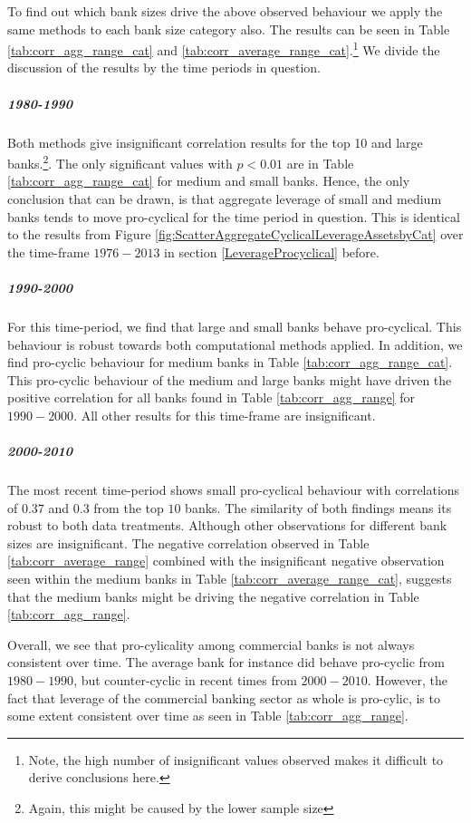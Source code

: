 \documentclass[12pt, a4paper]{article} %
\begin{document}
To find out which bank sizes drive the above observed behaviour we apply the same methods to each bank size category also. The results can be seen in Table \ref{tab:corr_agg_range_cat} and \ref{tab:corr_average_range_cat}.\footnote{Note, the high number of insignificant values observed makes it difficult to derive conclusions here.}
We divide the discussion of the results by the time periods in question.

\subparagraph{1980-1990}
Both methods give insignificant correlation results for the top 10 and large banks.\footnote{Again, this might be caused by the lower sample size}. The only significant values with $p<0.01$ are in Table \ref{tab:corr_agg_range_cat} for medium and small banks. Hence, the only conclusion that can be drawn, is that aggregate leverage of small and medium banks tends to move pro-cyclical for the time period in question. This is identical to the results from Figure \ref{fig:ScatterAggregateCyclicalLeverageAssetsbyCat} over the time-frame $1976-2013$ in section \ref{LeverageProcyclical} before. 

\subparagraph{1990-2000}
For this time-period, we find that large and small banks behave pro-cyclical. This behaviour is robust towards both computational methods applied. In addition, we find pro-cyclic behaviour for medium banks in Table \ref{tab:corr_agg_range_cat}. This pro-cyclic behaviour of the medium and large banks might have driven the positive correlation for all banks found in Table \ref{tab:corr_agg_range} for $1990-2000$. All other results for this time-frame are insignificant.

\subparagraph{2000-2010}
The most recent time-period shows small pro-cyclical behaviour with correlations of $0.37$ and $0.3$ from the top $10$ banks. The similarity of both findings means its robust to both data treatments. Although other observations for different bank sizes are insignificant. The negative correlation observed in Table \ref{tab:corr_average_range} combined with the insignificant negative observation seen within the medium banks in Table \ref{tab:corr_average_range_cat}, suggests that the medium banks might be driving the negative correlation in Table \ref{tab:corr_agg_range}. 

Overall, we see that pro-cylicality among commercial banks is not always consistent over time. The average bank for instance did behave pro-cyclic from $1980-1990$, but counter-cyclic in recent times from $2000-2010$. 
However, the fact that leverage of the commercial banking sector as whole is pro-cylic, is to some extent consistent over time as seen in Table \ref{tab:corr_agg_range}. 
\end{document}
